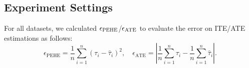 \documentclass[runningheads]{llncs}
\newcommand{\etal}{{et al.}}
\begin{document}

\subsection{Experiment Settings}

For all datasets, we calculated  $\epsilon_{\rm{PEHE}}$/$\epsilon_{\rm{ATE}}$ to evaluate the error on ITE/ATE estimations as follows:
\begin{equation}
    \epsilon_{\mathrm{PEHE}}=\frac{1}{n}\sum^n_{i=1}(\tau_i-\hat{\tau}_i)^2,\quad \epsilon_{\mathrm{ATE}}=\left\vert\frac{1}{n}\sum_{i =1}^{n}\tau_i-\frac{1}{n}\sum_{i =1}^{n}\hat{\tau}_i\right\vert.
\end{equation}
\end{document}
